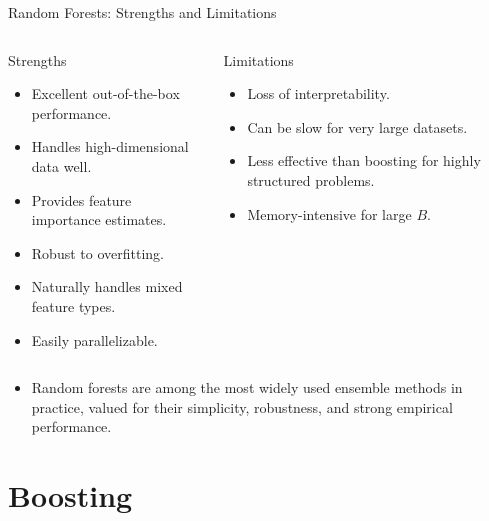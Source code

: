 \begin{frame}{Random Forests: Strengths and Limitations}
  \begin{columns}[t]
      \begin{block}{Strengths}
        \begin{itemize}
          \item Excellent \alert{out-of-the-box performance}.
          \item Handles high-dimensional data well.
          \item Provides feature importance estimates.
          \item Robust to overfitting.
          \item Naturally handles mixed feature types.
          \item Easily parallelizable.
        \end{itemize}
      \end{block}
      \begin{block}{Limitations}
        \begin{itemize}
          \item Loss of interpretability.
          \item Can be slow for very large datasets.
          \item Less effective than boosting for highly structured problems.
          \item Memory-intensive for large $B$.
        \end{itemize}
      \end{block}
  \end{columns}
  \vspace{0.6em}
  \begin{itemize}
    \item Random forests are among the most widely used ensemble methods in practice,
          valued for their simplicity, robustness, and strong empirical performance.
  \end{itemize}
\end{frame}

\section{Boosting}

